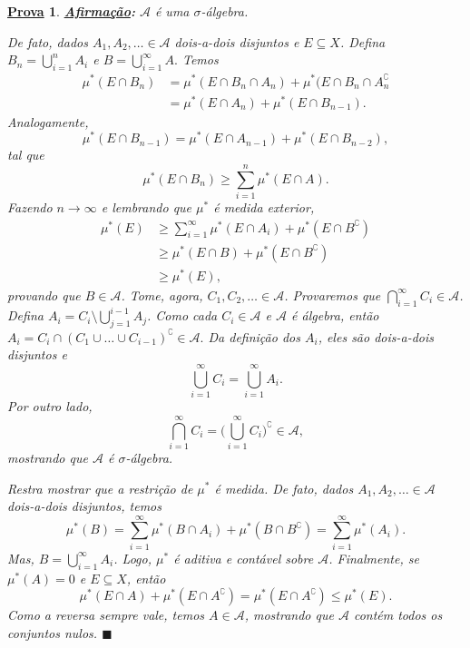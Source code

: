\documentclass{article}
\newtheorem*{proof*}{\underline{Prova}}
\renewcommand\qedsymbol{$\blacksquare$}
\begin{document}
\begin{proof*}
	\textbf{\underline{Afirmação}:} \(\mathcal{A}\) é uma \(\sigma \)-álgebra.

	De fato, dados \(A_{1}, A_{2}, \dotsc \in \mathcal{A}\) dois-a-dois disjuntos e \(E\subseteq X\). Defina \(B_{n} = \bigcup_{i=1}^{n}A_{i}\) e \(B = \bigcup_{i=1}^{\infty}A.\) Temos
	\begin{align*}
		\mu ^{*}(E\cap B_{n}) & = \mu ^{*}(E\cap B_{n}\cap A_{n}) + \mu ^{*}(E\cap B_{n}\cap A_{n}^{\complement} \\
		                      & = \mu ^{*}(E\cap A_{n}) + \mu ^{*}(E\cap B_{n-1}).
	\end{align*}
	Analogamente,
	\[
		\mu ^{*}(E\cap B_{n-1}) = \mu ^{*}(E\cap A_{n-1}) + \mu ^{*}(E\cap B_{n-2}),
	\]
	tal que
	\[
		\mu ^{*}(E\cap B_{n}) \geq \sum\limits_{i=1}^{n}\mu ^{*}(E\cap A).
	\]
	Fazendo \(n\to\infty\) e lembrando que \(\mu ^{*}\) é medida exterior,
	\begin{align*}
		\mu ^{*}(E) & \geq \sum\limits_{i=1}^{\infty}\mu ^{*}(E\cap A_{i}) + \mu ^{*}(E\cap B ^{\complement}) \\
		            & \geq \mu ^{*}(E\cap B) + \mu ^{*}(E\cap B ^{\complement})                               \\
		            & \geq \mu ^{*}(E),
	\end{align*}
	provando que \(B\in \mathcal{A}\). Tome, agora, \(C_{1}, C_{2}, \dotsc \in \mathcal{A}\). Provaremos que \(\bigcap_{i=1}^{\infty}C_{i}\in \mathcal{A}\).
	Defina \(A_{i} = C_i\setminus{\bigcup_{j=1}^{i-1}A_{j}}\). Como cada \(C_{i}\in \mathcal{A}\) e \(\mathcal{A}\) é álgebra, então
	\(A_{i} = C_{i}\cap (C_{1}\cup \dotsc \cup C_{i-1}) ^{\complement}\in \mathcal{A}.\) Da definição dos \(A_{i}\), eles são dois-a-dois
	disjuntos e
	\[
		\bigcup_{i=1}^{\infty}C_{i} = \bigcup_{i=1}^{\infty}A_{i}.
	\]
	Por outro lado,
	\[
		\bigcap_{i=1}^{\infty}C_{i} = \biggl(\bigcup_{i=1}^{\infty}C_{i}\biggr)^{\complement}\in \mathcal{A},
	\]
	mostrando que \(\mathcal{A}\) é \(\sigma \)-álgebra.

	Restra mostrar que a restrição de \(\mu ^{*}\) é medida. De fato, dados \(A_{1}, A_2, \dotsc \in \mathcal{A}\) dois-a-dois disjuntos,
	temos
	\[
		\mu ^{*}(B) = \sum\limits_{i=1}^{\infty}\mu ^{*}(B\cap A_{i}) + \mu ^{*}(B\cap B ^{\complement}) = \sum\limits_{i=1}^{\infty}\mu ^{*}(A_{i}).
	\]
	Mas, \(B = \bigcup_{i=1}^{\infty}A_{i}\). Logo, \(\mu ^{*}\) é aditiva e contável sobre \(\mathcal{A}\). Finalmente, se \(\mu ^{*}(A) = 0\) e \(E\subseteq X\), então
	\[
		\mu ^{*}(E\cap A) + \mu ^{*}(E\cap A ^{\complement}) = \mu ^{*}(E\cap A ^{\complement}) \leq \mu ^{*}(E).
	\]
	Como a reversa sempre vale, temos \(A\in \mathcal{A}\), mostrando que \(\mathcal{A}\) contém todos os conjuntos nulos. \qedsymbol
\end{proof*}
\end{document}
